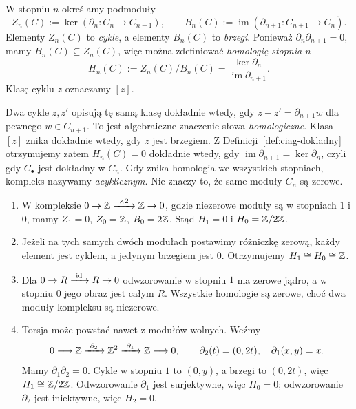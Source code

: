 \begin{definicja}
\label{def:homologia-algebraiczna}
W stopniu $n$ określamy podmoduły
\[
 Z_n(C):=\ker(\partial_n:C_n\to C_{n-1}),\qquad
 B_n(C):=\operatorname{im}(\partial_{n+1}:C_{n+1}\to C_n).
\]
Elementy $Z_n(C)$ to \emph{cykle}, a elementy
$B_n(C)$ to \emph{brzegi}. Ponieważ
$\partial_n\partial_{n+1}=0$, mamy $B_n(C)\subseteq Z_n(C)$,
więc można zdefiniować \emph{homologię stopnia $n$}
\begin{equation}\label{eq:homologia-def}
 H_n(C):=Z_n(C)/B_n(C)
 =\frac{\ker \partial_n}{\operatorname{im}\partial_{n+1}}.
\end{equation}
Klasę cyklu $z$ oznaczamy $[z]$.
\end{definicja}

Dwa cykle $z,z'$ opisują tę samą klasę dokładnie
wtedy, gdy $z-z'=\partial_{n+1}w$ dla pewnego
$w\in C_{n+1}$. To jest algebraiczne
znaczenie słowa \emph{homologiczne}.
Klasa $[z]$ znika dokładnie wtedy, gdy
$z$ jest brzegiem. Z Definicji~\ref{def:ciag-dokladny}
otrzymujemy zatem
$H_n(C)=0$ dokładnie wtedy, gdy
$\operatorname{im}\partial_{n+1}=\ker\partial_n$,
czyli gdy $C_\bullet$ jest dokładny w $C_n$.
Gdy znika homologia we wszystkich stopniach,
kompleks nazywamy \emph{acyklicznym}.
Nie znaczy to, że same moduły $C_n$ są zerowe.

\begin{przyklad}
\label{prz:homologia-rachunki}
\begin{enumerate}[leftmargin=*]
\item W kompleksie
      $0\to\Z\xrightarrow{\ \times2\ }\Z\to0$,
      gdzie niezerowe moduły są w stopniach
      $1$ i $0$, mamy $Z_1=0$, $Z_0=\mathbb{Z}$,
      $B_0=2\mathbb{Z}$. Stąd
      $H_1=0$ i $H_0=\mathbb{Z}/2\mathbb{Z}$.
\item Jeżeli na tych samych dwóch modułach
      postawimy różniczkę zerową, każdy element
      jest cyklem, a jedynym brzegiem jest $0$.
      Otrzymujemy $H_1\cong H_0\cong\mathbb{Z}$.
\item Dla
      $0\to R\xrightarrow{\ \id\ }R\to0$
      odwzorowanie w stopniu $1$ ma zerowe jądro,
      a w stopniu $0$ jego obraz jest całym $R$.
      Wszystkie homologie są zerowe, choć
      dwa moduły kompleksu są niezerowe.
\item Torsja może powstać nawet z modułów
      wolnych. Weźmy
      \[
       0\longrightarrow\mathbb{Z}
       \xrightarrow{\ \partial_2\ }\mathbb{Z}^2
       \xrightarrow{\ \partial_1\ }\mathbb{Z}
       \longrightarrow0,\qquad
       \partial_2(t)=(0,2t),\quad \partial_1(x,y)=x.
      \]
      Mamy $\partial_1\partial_2=0$.
      Cykle w stopniu $1$ to $(0,y)$,
      a brzegi to $(0,2t)$, więc
      $H_1\cong\mathbb{Z}/2\mathbb{Z}$. Odwzorowanie $\partial_1$ jest
      surjektywne, więc $H_0=0$; odwzorowanie
      $\partial_2$ jest iniektywne, więc $H_2=0$.
\end{enumerate}
\end{przyklad}

